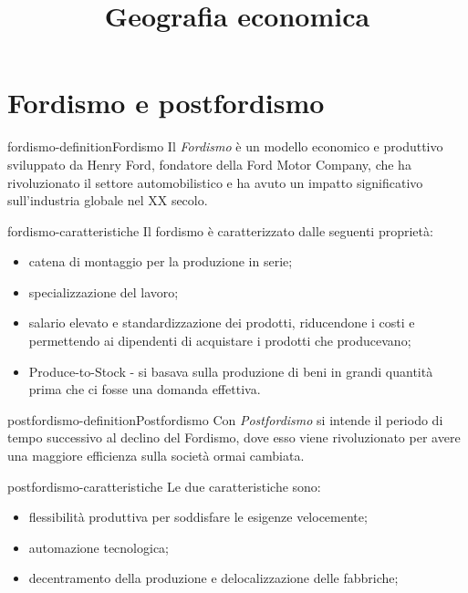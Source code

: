 \documentclass[preview]{standalone}
\begin{document}
\title{Geografia economica}
\genpage

\section{Fordismo e postfordismo}

\begin{snippetdefinition}{fordismo-definition}{Fordismo}
    Il \textit{Fordismo} è un modello economico e produttivo sviluppato da Henry Ford,
    fondatore della Ford Motor Company, che ha rivoluzionato il settore automobilistico
    e ha avuto un impatto significativo sull'industria globale nel XX secolo.
\end{snippetdefinition}

\begin{snippet}{fordismo-caratteristiche}
    Il fordismo è caratterizzato dalle seguenti proprietà:
    \begin{itemize}
        \item catena di montaggio per la produzione in serie;
        \item specializzazione del lavoro;
        \item salario elevato e standardizzazione dei prodotti, riducendone i costi e permettendo ai dipendenti di acquistare i prodotti che producevano;
        \item Produce-to-Stock - si basava sulla produzione di beni in grandi quantità prima che ci fosse una domanda effettiva.
    \end{itemize}
\end{snippet}

\begin{snippetdefinition}{postfordismo-definition}{Postfordismo}
    Con \textit{Postfordismo} si intende il periodo di tempo
    successivo al declino del Fordismo, dove esso viene rivoluzionato per avere una maggiore efficienza
    sulla società ormai cambiata.
\end{snippetdefinition}

\begin{snippet}{postfordismo-caratteristiche}
    Le due caratteristiche sono:
    \begin{itemize}
        \item flessibilità produttiva per soddisfare le esigenze velocemente;
        \item automazione tecnologica;
        \item decentramento della produzione e delocalizzazione delle fabbriche;
    \end{itemize}
\end{snippet}
\end{document}
